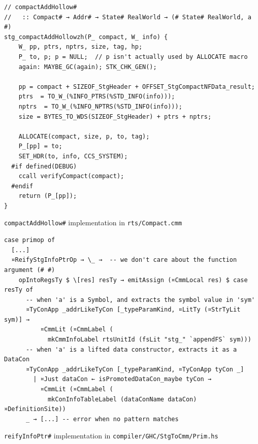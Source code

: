 \documentclass[english]{jflart}
\begin{document}
\begin{table}[p]
\small
\begin{verbatim}
// compactAddHollow#
//   :: Compact# → Addr# → State# RealWorld → (# State# RealWorld, a #)
stg_compactAddHollowzh(P_ compact, W_ info) {
    W_ pp, ptrs, nptrs, size, tag, hp;
    P_ to, p; p = NULL;  // p isn't actually used by ALLOCATE macro
    again: MAYBE_GC(again); STK_CHK_GEN();

    pp = compact + SIZEOF_StgHeader + OFFSET_StgCompactNFData_result;
    ptrs  = TO_W_(%INFO_PTRS(%STD_INFO(info)));
    nptrs  = TO_W_(%INFO_NPTRS(%STD_INFO(info)));
    size = BYTES_TO_WDS(SIZEOF_StgHeader) + ptrs + nptrs;
    
    ALLOCATE(compact, size, p, to, tag);
    P_[pp] = to;
    SET_HDR(to, info, CCS_SYSTEM);
  #if defined(DEBUG)
    ccall verifyCompact(compact);
  #endif
    return (P_[pp]);
}
\end{verbatim}
\caption{\texttt{compactAddHollow\#} implementation in \texttt{rts/Compact.cmm}}
\label{table:impl-compactAddHollow}
\end{table}

\begin{table}[p]
\small
\begin{verbatim}
case primop of
  [...]
  ¤ReifyStgInfoPtrOp → \_ →  -- we don't care about the function argument (# #)
    opIntoRegsTy $ \[res] resTy → emitAssign (¤CmmLocal res) $ case resTy of
      -- when 'a' is a Symbol, and extracts the symbol value in 'sym'
      ¤TyConApp _addrLikeTyCon [_typeParamKind, ¤LitTy (¤StrTyLit sym)] →
          ¤CmmLit (¤CmmLabel (
            mkCmmInfoLabel rtsUnitId (fsLit "stg_" `appendFS` sym)))
      -- when 'a' is a lifted data constructor, extracts it as a DataCon
      ¤TyConApp _addrLikeTyCon [_typeParamKind, ¤TyConApp tyCon _]
        | ¤Just dataCon ← isPromotedDataCon_maybe tyCon →
          ¤CmmLit (¤CmmLabel (
            mkConInfoTableLabel (dataConName dataCon) ¤DefinitionSite))
      _ → [...] -- error when no pattern matches
\end{verbatim}
\caption{\texttt{reifyInfoPtr\#} implementation in \texttt{compiler/GHC/StgToCmm/Prim.hs}}
\label{table:impl-reifyInfoPtr}
\end{table}
\end{document}
